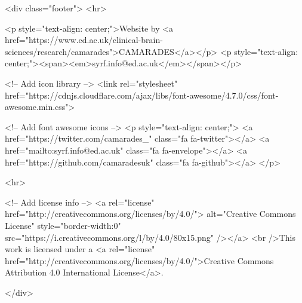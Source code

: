 \documentclass[
]{book}
\begin{document}
  

<div class="footer">
<hr>



<p style="text-align: center;">Website by <a href="https://www.ed.ac.uk/clinical-brain-sciences/research/camarades">CAMARADES</a></p>
<p style="text-align: center;"><span><em>syrf.info@ed.ac.uk</em></span></p>




<!-- Add icon library -->
<link rel="stylesheet" href="https://cdnjs.cloudflare.com/ajax/libs/font-awesome/4.7.0/css/font-awesome.min.css">



<!-- Add font awesome icons -->
<p style="text-align: center;">
<a href="https://twitter.com/camarades_" class="fa fa-twitter"></a>
<a href="mailto:syrf.info@ed.ac.uk" class="fa fa-envelope"></a>
<a href="https://github.com/camaradesuk" class="fa fa-github"></a>
</p>



<hr>



<!-- Add license info -->
<a rel="license" href="http://creativecommons.org/licenses/by/4.0/"> alt="Creative Commons License" style="border-width:0" src="https://i.creativecommons.org/l/by/4.0/80x15.png" /></a>
<br />This work is licensed under a <a rel="license" href="http://creativecommons.org/licenses/by/4.0/">Creative Commons Attribution 4.0 International License</a>.




</div>
\end{document}
